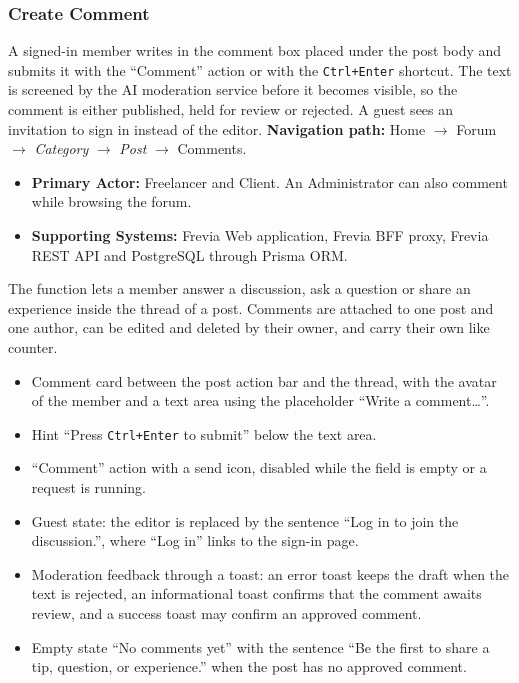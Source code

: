 \subsubsection{ Create Comment}

A signed-in member writes in the comment box placed under the post body and submits it with the
``Comment'' action or with the \texttt{Ctrl+Enter} shortcut. The text is screened by the AI
moderation service before it becomes visible, so the comment is either published, held for review
or rejected. A guest sees an invitation to sign in instead of the editor.\newline
\textbf{Navigation path:} Home $\rightarrow$ Forum $\rightarrow$ \textit{Category} $\rightarrow$
\textit{Post} $\rightarrow$ Comments.


\begin{itemize}[leftmargin=1.6em,topsep=3pt,itemsep=2pt,parsep=0pt,label=$\bullet$]
      \item \textbf{Primary Actor:} Freelancer and Client. An Administrator can also comment while
            browsing the forum.
      \item \textbf{Supporting Systems:} Frevia Web application, Frevia BFF proxy, Frevia REST API
            and PostgreSQL through Prisma ORM.
\end{itemize}

\noindent The function lets a member answer a discussion, ask a question or share an experience
inside the thread of a post. Comments are attached to one post and one author, can be edited and
deleted by their owner, and carry their own like counter.

\begin{itemize}[leftmargin=1.6em,topsep=3pt,itemsep=2pt,parsep=0pt,label=$\bullet$]
      \item Comment card between the post action bar and the thread, with the avatar of the
            member and a text area using the placeholder ``Write a comment\ldots''.
      \item Hint ``Press \texttt{Ctrl+Enter} to submit'' below the text area.
      \item ``Comment'' action with a send icon, disabled while the field is empty or a request is
            running.
      \item Guest state: the editor is replaced by the sentence ``Log in to join the
            discussion.'', where ``Log in'' links to the sign-in page.
      \item Moderation feedback through a toast: an error toast keeps the draft when the
            text is rejected, an informational toast confirms that the comment awaits
            review, and a success toast may confirm an approved comment.
      \item Empty state ``No comments yet'' with the sentence ``Be the first to share a
            tip, question, or experience.'' when the post has no approved comment.
\end{itemize}

